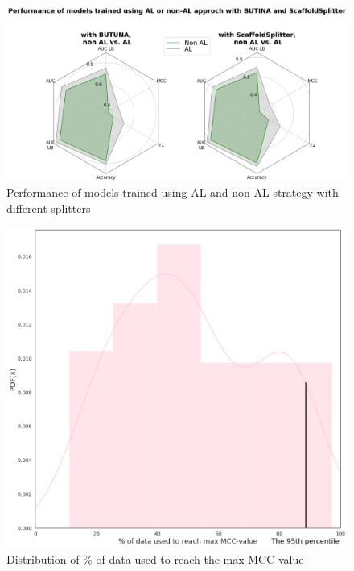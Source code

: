 \documentclass[a4paper,10pt]{article}
\begin{document}
\begin{figure}
    \centering
    \includegraphics[keepaspectratio=true, scale=0.32]{images/splitters.png}
    \caption{Performance of models trained using AL and non-AL strategy with different splitters}
    \label{fig:4}
\end{figure}

\begin{figure}
    \centering
    \includegraphics[keepaspectratio=true, scale=0.47]{images/percent_of_data_max_MCC.png}
    \caption{Distribution of \% of data used to reach the max MCC value}
    \label{fig:5}
\end{figure}
\end{document}
